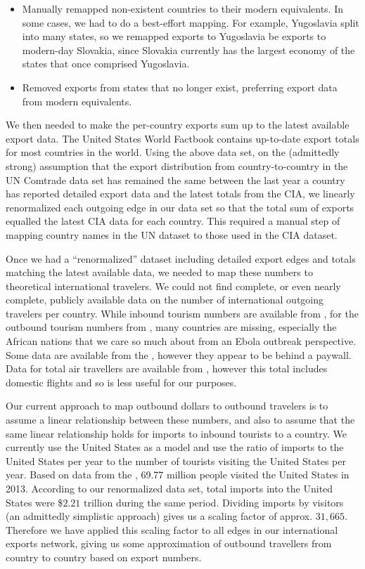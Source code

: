 \documentclass[10pt, journal,onecolumn]{IEEEtran}
\begin{document}
\begin{itemize}
\item Manually remapped non-existent countries to their modern equivalents.
      In some cases, we had to do a best-effort mapping. For example, Yugoslavia split into many
      states, so we remapped exports to Yugoslavia be exports to modern-day Slovakia,
      since Slovakia currently has the largest economy of the states that once comprised Yugoslavia.
\item Removed exports from states that no longer exist, preferring export data from
      modern equivalents.
\end{itemize}

We then needed to make the per-country exports sum up to the latest available export data.
The United States \cite{ciatotalexports} World Factbook contains up-to-date export totals
for most countries in the world. Using the above data set, on the (admittedly strong) assumption
that the export distribution
from country-to-country in the UN Comtrade data set has remained the same between the last year a
country has reported detailed export data and the latest totals from the CIA, we linearly renormalized
each outgoing edge in our data set so that the total sum of exports equalled the latest CIA data
for each country.
This required a manual step of mapping country names in the UN dataset to those used in
the CIA dataset.

Once we had a ``renormalized'' dataset including detailed export edges and totals matching
the latest available data, we needed to map these numbers to theoretical international travelers.
We could not find complete, or even nearly complete, publicly available data on the number of
international outgoing travelers per country. While inbound tourism numbers are available from
\cite{worldbankinboundtourism}, for the outbound tourism numbers from \cite{worldbankoutboundtourism},
many countries are missing,
especially the African nations that we care so much about from an Ebola outbreak perspective.
Some data are available from the \cite{unwtooutboundtourism}, however they appear to be behind a paywall.
Data for total air travellers are available from \cite{worldbankairpassengers},
however this total includes domestic flights and so is less useful for our purposes.

Our current approach to map outbound dollars to outbound travelers is to assume a linear relationship
between these numbers, and also to assume that the same linear relationship holds for imports to
inbound tourists to a country.
We currently use the United States as a model and use the ratio of
imports to the United States per year to the number of tourists visiting the United States per year.
Based on data from the \cite{usinboundtourists}, 69.77 million people visited the United States in 2013.
According to our renormalized data set, total imports into the United States were
\$$2.21$ trillion during the same period. Dividing imports by visitors (an admittedly
simplistic approach) gives us a scaling factor of approx. $31,665$. Therefore we have applied this
scaling factor to all edges in our international exports network, giving us some approximation of
outbound travellers from country to country based on export numbers.
\end{document}
